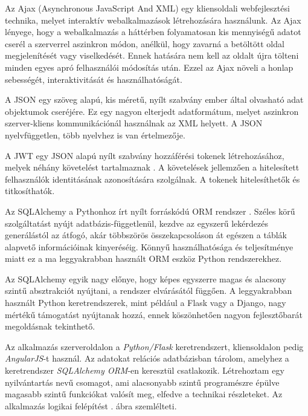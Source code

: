 
Az Ajax (Asynchronous JavaScript And XML) egy kliensoldali webfejlesztési technika, melyet interaktív webalkalmazások létrehozására használunk. Az Ajax lényege, hogy a webalkalmazás a háttérben folyamatosan kis mennyiségű adatot cserél a szerverrel aszinkron módon, anélkül, hogy zavarná a betöltött oldal megjelenítését vagy viselkedését. Ennek hatására nem kell az oldalt újra tölteni minden egyes apró felhasználói módosítás után. Ezzel az Ajax növeli a honlap sebességét, interaktivitását és használhatóságát.


A JSON egy szöveg alapú, kis méretű, nyílt szabvány ember által olvasható adat objektumok cseréjére. Ez egy nagyon elterjedt adatformátum, melyet aszinkron szerver-kliens kommunikációnál használnak az XML helyett. A JSON nyelvfüggetlen, több nyelvhez is van értelmezője.

A JWT egy JSON alapú nyílt szabvány hozzáférési tokenek létrehozásához, melyek néhány követelést tartalmaznak \cite{jwt}. A követelések jellemzően a hitelesített felhasználók identitásának azonosítására szolgálnak. A tokenek hitelesíthetők és titkosíthatók.


Az SQLAlchemy a Pythonhoz írt nyílt forráskódú ORM rendszer \cite{sqlalchemy}. Széles körű szolgáltatást nyújt adatbázis-függetlenül, kezdve az egyszerű lekérdezés generálástól az átfogó, akár többszörös összekapcsoláson át egészen a táblák alapvető információinak kinyeréséig. Könnyű használhatósága és teljesítménye miatt ez a ma leggyakrabban használt ORM eszköz Python rendszerekhez.

Az SQLAlchemy egyik nagy előnye, hogy képes egyszerre magas és alacsony szintű absztrakciót nyújtani, a rendszer elvárásától függően. A leggyakrabban használt Python keretrendszerek, mint például a Flask vagy a Django, nagy mértékű támogatást nyújtanak hozzá, ennek köszönhetően nagyon fejlesztőbarát megoldásnak tekinthető.


Az alkalmazás szerveroldalon a \textit{Python/Flask} keretrendszert, kliensoldalon pedig \textit{AngularJS}-t használ. Az adatokat relációs adatbázisban tárolom, amelyhez a keretrendszer \textit{SQLAlchemy ORM}-en keresztül csatlakozik. Létrehoztam egy nyilvántartás nevű csomagot, ami alacsonyabb szintű programészre épülve magasabb szintű funkciókat valósít meg, elfedve a technikai részleteket. Az alkalmazás logikai felépítést . ábra szemlélteti.

